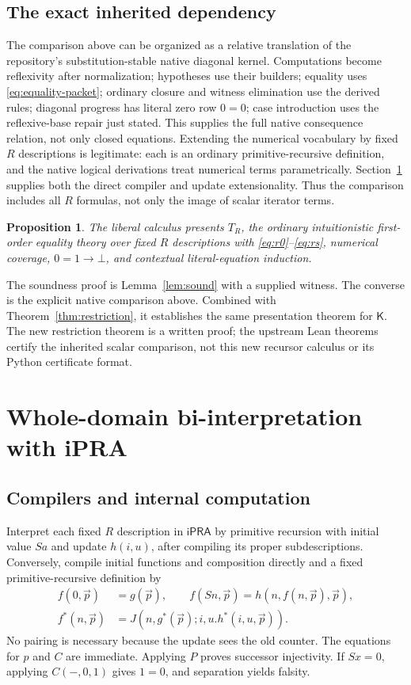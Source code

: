 \documentclass[11pt,letterpaper]{article}
\newtheorem{proposition}[theorem]{Proposition}
\theoremstyle{definition}\newtheorem{definition}[theorem]{Definition}
\theoremstyle{remark}\newtheorem{remark}[theorem]{Remark}
\newcommand{\ipra}{\mathsf{iPRA}}
\newcommand{\K}{\mathsf K}
\begin{document}
\subsection{The exact inherited dependency}
The comparison above can be organized as a relative translation of the
repository's substitution-stable native diagonal kernel. Computations
become reflexivity after normalization; hypotheses use their builders;
equality uses \eqref{eq:equality-packet}; ordinary closure and witness
elimination use the derived rules; diagonal progress has literal zero
row $0=0$; case introduction uses the reflexive-base repair just stated.
This supplies the full native consequence relation, not only closed
equations. Extending the numerical vocabulary by fixed $R$ descriptions
is legitimate: each is an ordinary primitive-recursive definition, and
the native logical derivations treat numerical terms parametrically.
Section~\ref{sec:ordinary} supplies both the direct compiler and update
extensionality. Thus the comparison includes all $R$ formulas, not only
the image of scalar iterator terms.

\begin{proposition}\label{prop:liberal}
The liberal calculus presents $T_R$, the ordinary intuitionistic
first-order equality theory over fixed $R$ descriptions with
\eqref{eq:r0}--\eqref{eq:rs}, numerical coverage, $0=1\to\bot$, and
contextual literal-equation induction.
\end{proposition}
The soundness proof is Lemma~\ref{lem:sound} with a supplied witness.
The converse is the explicit native comparison above. Combined with
Theorem~\ref{thm:restriction}, it establishes the same presentation
theorem for $\K$. The new restriction theorem is a written proof;
the upstream Lean theorems certify the inherited scalar comparison,
not this new recursor calculus or its Python certificate format.

\section{Whole-domain bi-interpretation with iPRA}\label{sec:ordinary}
\subsection{Compilers and internal computation}
Interpret each fixed $R$ description in $\ipra$ by primitive recursion
with initial value $Sa$ and update $h(i,u)$, after compiling its proper
subdescriptions. Conversely, compile initial functions and composition
directly and a fixed primitive-recursive definition by
\[
 \begin{split}
 f(0,\vec p)&=g(\vec p),\qquad
 f(Sn,\vec p)=h(n,f(n,\vec p),\vec p),\\[-2pt]
 f^*(n,\vec p)&=J(n,g^*(\vec p);i,u.h^*(i,u,\vec p)).
 \end{split}
\]
No pairing is necessary because the update sees the old counter.
The equations for $p$ and $C$ are immediate. Applying $P$ proves
successor injectivity. If $Sx=0$, applying $C(-,0,1)$ gives $1=0$,
and separation yields falsity.
\end{document}
